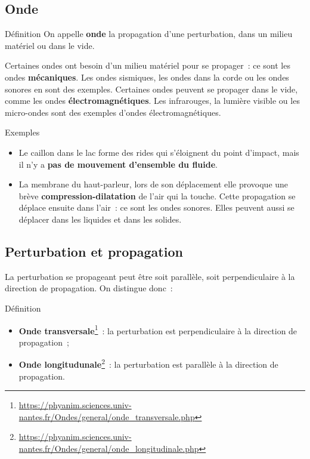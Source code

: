 \documentclass[../main/main.tex]{subfiles}
\begin{document}
\subsection{Onde}
\begin{bdefi}{\tiny Définition}
    On appelle \textbf{onde} la propagation d’une perturbation, dans un milieu
    matériel ou dans le vide.
\end{bdefi}

Certaines ondes ont besoin d’un milieu matériel pour se propager~: ce sont les
ondes \textbf{mécaniques}. Les ondes sismiques, les ondes dans la corde ou les
ondes sonores en sont des exemples. Certaines ondes peuvent se propager dans le
vide, comme les ondes \textbf{électromagnétiques}. Les infrarouges, la lumière
visible ou les micro-ondes sont des exemples d’ondes électromagnétiques.

\begin{rexem}{Exemples}
    \begin{itemize}
        \item Le caillon dans le lac forme des rides qui s'éloignent du point
            d'impact, mais il n'y a \textbf{pas de mouvement d'ensemble du
            fluide}.
        \item La membrane du haut-parleur, lors de son déplacement elle provoque
            une brève \textbf{compression-dilatation} de l’air qui la touche.
            Cette propagation se déplace ensuite dans l’air~: ce sont les ondes
            sonores. Elles peuvent aussi se déplacer dans les liquides et dans
            les solides.
    \end{itemize}
\end{rexem}

\subsection{Perturbation et propagation}

La perturbation se propageant peut être soit parallèle, soit perpendiculaire à
la direction de propagation. On distingue donc~:

\begin{rdefi}{Définition}
    \begin{itemize}
        \item \textbf{Onde transversale}\footnote{\url{https://phyanim.sciences.univ-nantes.fr/Ondes/general/onde_transversale.php}}~: la perturbation est perpendiculaire à
            la direction de propagation~;
        \item \textbf{Onde longitudunale}\footnote{\url{https://phyanim.sciences.univ-nantes.fr/Ondes/general/onde_longitudinale.php}}~: la perturbation est parallèle à la
            direction de propagation.
    \end{itemize}
\end{rdefi}
\end{document}
